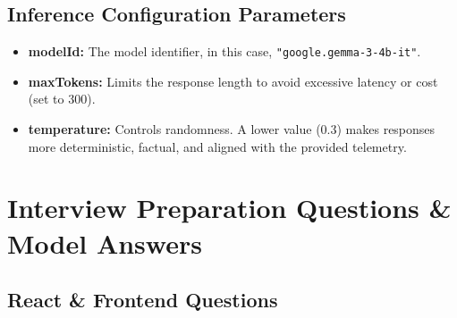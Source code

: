 \documentclass[11pt,a4paper]{article}
\begin{document}
\subsection{Inference Configuration Parameters}
\begin{itemize}
    \item \textbf{modelId:} The model identifier, in this case, \texttt{"google.gemma-3-4b-it"}.
    \item \textbf{maxTokens:} Limits the response length to avoid excessive latency or cost (set to 300).
    \item \textbf{temperature:} Controls randomness. A lower value (0.3) makes responses more deterministic, factual, and aligned with the provided telemetry.
\end{itemize}

\newpage
\section{Interview Preparation Questions \& Model Answers}

\subsection{React \& Frontend Questions}
\end{document}
